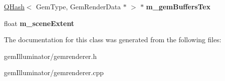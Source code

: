\begin{DoxyCompactItemize}
\item 
\hypertarget{class_gem_renderer_ac09a5c2581e1500071429a833cf2bc56}{}\hyperlink{class_q_hash}{Q\+Hash}$<$ Gem\+Type, Gem\+Render\+Data $\ast$ $>$ $\ast$ {\bfseries m\+\_\+gem\+Buffers\+Tex}\label{class_gem_renderer_ac09a5c2581e1500071429a833cf2bc56}

\item 
\hypertarget{class_gem_renderer_a24391e7dfe1663b9c74210fb0424487d}{}float {\bfseries m\+\_\+scene\+Extent}\label{class_gem_renderer_a24391e7dfe1663b9c74210fb0424487d}

\end{DoxyCompactItemize}


The documentation for this class was generated from the following files\+:\begin{DoxyCompactItemize}
\item 
gem\+Illuminator/gemrenderer.\+h\item 
gem\+Illuminator/gemrenderer.\+cpp\end{DoxyCompactItemize}
